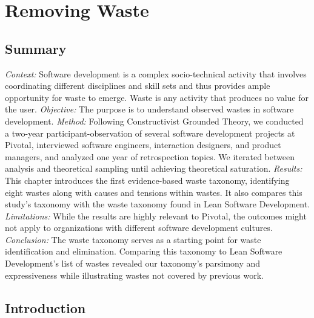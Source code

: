 \chapter{Removing Waste}
\label{SoftwareEngineeringWasteChapter}
\section{Summary}

\textit{Context:} Software development is a complex socio-technical activity that involves coordinating different disciplines and skill sets and thus provides ample opportunity for waste to emerge. Waste is any activity that produces no value for the user.
\textit{Objective:} The purpose is to understand observed wastes in software development.
\textit{Method:} Following Constructivist Grounded Theory, we conducted a two-year participant-observation of several software development projects at Pivotal, interviewed \numberOfInterviews{} software engineers, interaction designers, and product managers, and analyzed one year of retrospection topics. We iterated between analysis and theoretical sampling until achieving theoretical saturation.
\textit{Results:}  This chapter introduces the first evidence-based waste taxonomy, identifying eight wastes along with causes and tensions within wastes. It also compares this study's taxonomy with the waste taxonomy found in Lean Software Development.
\textit{Limitations:} While the results are highly relevant to Pivotal, the outcomes might not apply to organizations with different software development cultures.
\textit{Conclusion:} The waste taxonomy serves as a starting point for waste identification and elimination. Comparing this taxonomy to Lean Software Development's list of wastes revealed our taxonomy's parsimony and expressiveness while illustrating wastes not covered by previous work. 

\section{Introduction}

